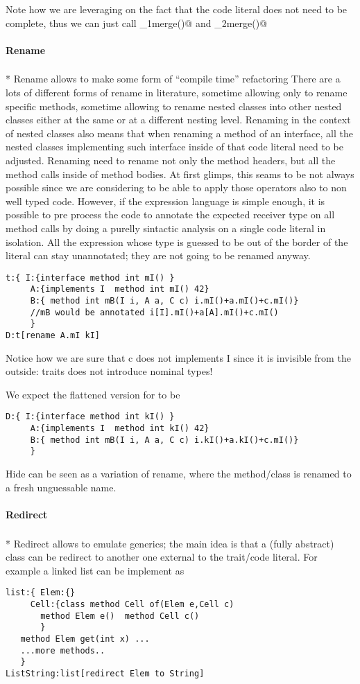 Note how we are leveraging on the fact that the code literal does not need to be complete, thus we can just call \Q@_1merge()@ and \Q@_2merge()@


\paragraph*{Rename}${}_{}$\\*
Rename allows to make some form of ``compile time'' refactoring
There are a lots of different forms of rename in literature,
sometime allowing only to rename specific methods, sometime allowing to rename
nested classes into other nested classes either at the same or at a different nesting level.
Renaming in the context of nested classes also means that when renaming a method of an interface, all the 
nested classes implementing such interface inside of that code literal need to be adjusted.
Renaming need to rename not only the method headers, but all the method calls inside of method bodies.
At first glimps, this seams to be not always possible since we are considering to be able to apply those
operators also to non well typed code.
However, if the expression language is simple enough, it is possible to pre process the code to
annotate the expected receiver type on all method calls by doing a purelly sintactic analysis
on a single code literal in isolation. 
All the expression whose type is guessed to be out of the border of the literal can stay unannotated; they are not going to be renamed anyway.

\begin{lstlisting}
t:{ I:{interface method int mI() }
     A:{implements I  method int mI() 42}
     B:{ method int mB(I i, A a, C c) i.mI()+a.mI()+c.mI()}
     //mB would be annotated i[I].mI()+a[A].mI()+c.mI()
     }
D:t[rename A.mI kI]
\end{lstlisting}
 Notice how we are sure that c does not implements I since it is invisible from the outside: traits does not introduce nominal types!
 
 We expect the flattened version for \Q@D@ to be
\begin{lstlisting}
D:{ I:{interface method int kI() }
     A:{implements I  method int kI() 42}
     B:{ method int mB(I i, A a, C c) i.kI()+a.kI()+c.mI()}
     }
\end{lstlisting}

Hide can be seen as a variation of rename, where the method/class is renamed to a fresh unguessable name.

\paragraph*{Redirect}${}_{}$\\*
Redirect allows to emulate generics; the main idea is that a (fully abstract) class can be redirect to another one external to the trait/code literal.
For example a linked list can be implement as
\begin{lstlisting}
list:{ Elem:{}
     Cell:{class method Cell of(Elem e,Cell c) 
       method Elem e()  method Cell c()
       }
   method Elem get(int x) ...
   ...more methods..
   }
ListString:list[redirect Elem to String]
\end{lstlisting}

